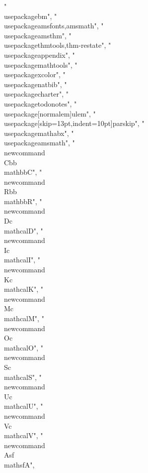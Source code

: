 {"\\usepackage{bm}",
"\\usepackage{amsfonts,amsmath}",
"\\usepackage{amsthm}",
"\\usepackage{thmtools,thm-restate}",
"\\usepackage{appendix}",
"\\usepackage{mathtools}",
"\\usepackage{xcolor}",
"\\usepackage{natbib}",
"\\usepackage{charter}",
"\\usepackage{todonotes}",
"\\usepackage[normalem]{ulem}",
"\\usepackage[skip=13pt,indent=10pt]{parskip}",
"\\usepackage{mathabx}",
"\\usepackage{amsmath}",
"\\newcommand{\\Cbb}{\\mathbb{C}}",
"\\newcommand{\\Rbb}{\\mathbb{R}}",
"\\newcommand{\\Dc}{\\mathcal{D}}",
"\\newcommand{\\Ic}{\\mathcal{I}}",
"\\newcommand{\\Kc}{\\mathcal{K}}",
"\\newcommand{\\Mc}{\\mathcal{M}}",
"\\newcommand{\\Oc}{\\mathcal{O}}",
"\\newcommand{\\Sc}{\\mathcal{S}}",
"\\newcommand{\\Uc}{\\mathcal{U}}",
"\\newcommand{\\Vc}{\\mathcal{V}}",
"\\newcommand{\\Asf}{\\mathsf{A}}",
}
